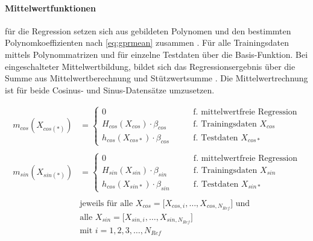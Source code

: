 \clearpage


\paragraph*{Mittelwertfunktionen} für die Regression setzen sich aus gebildeten Polynomen und den bestimmten Polynomkoeffizienten nach \autoref{eq:gprmean} zusammen \cite{Rasmussen2006}. Für alle Trainingsdaten mittels Polynommatrizen und für einzelne Testdaten über die Basis-Funktion. Bei eingeschalteter Mittelwertbildung, bildet sich das Regressionsergebnis über die Summe aus Mittelwertberechnung und Stützwertsumme \cite{Rasmussen2006}. Die Mittelwertrechnung ist für beide Cosinus- und Sinus-Datensätze umzusetzen. 


\begin{align}\label{eq:gprmean}
	m_{cos}(X_{cos(*)}) &=
		\begin{cases}
			0                                    &\qquad \text{f. mittelwertfreie Regression} \\
			H_{cos}(X_{cos}) \cdot \beta_{cos} 	 &\qquad \text{f. Trainingsdaten } X_{cos} \\
			h_{cos}(X_{cos*}) \cdot \beta_{cos} &\qquad \text{f. Testdaten } X_{cos*}
		\end{cases} \nonumber \\
	\\
	m_{sin}(X_{sin(*)}) &=
		\begin{cases}
			0                                    &\qquad \text{f. mittelwertfreie Regression} \\
			H_{sin}(X_{sin}) \cdot \beta_{sin} 	 &\qquad \text{f. Trainingsdaten } X_{sin} \\
			h_{cos}(X_{sin*}) \cdot \beta_{sin} &\qquad \text{f. Testdaten } X_{sin*}
		\end{cases} \nonumber \\
	\nonumber \\
& \text{jeweils für alle } X_{cos} = \big[ X_{cos,i},\dots, X_{cos,N_{Ref}} \big] \text{ und } \nonumber \\
& \text{alle } X_{sin} = \big[ X_{sin,i},\dots, X_{sin,N_{Ref}} \big] \nonumber \\
& \text{mit } i = 1,2,3,\ldots,N_{Ref} \nonumber
\end{align}


\clearpage


